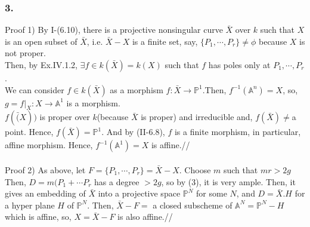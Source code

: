 \documentclass[12pt]{amsart}           %
\begin{document}
\subsubsection*{ 3.}

Proof 1) By I-(6.10), there is a projective nonsingular curve $\bar{X}$ over $k$ such that $X$ is an open subset of $\bar{X}$, i.e. $\bar{X} -X$ is a finite set, say, $\{P_1, \cdots, P_r \} \not = \phi$ because $X$ is not proper.\\
Then, by Ex.IV.1.2, $\exists f \in k(\bar{X}) = k(X)$ such that $f$ has poles only at $P_1 , \cdots, P_r$.\\
We can consider $f \in k(\bar{X})$ as a morphism $f : \bar{X} \to \mathbb{P}^1$.Then, $f^{-1} (\mathbb{A}^n) = X$, so, $g=f|_X : X \to \mathbb{A}^1$ is a morphism.\\
$f(\bar(X))$ is proper over $k$(because $\bar{X}$ is proper) and irreducible and, $f(\bar{X}) \not = $a point. Hence, $f(\bar{X}) = \mathbb{P}^1$. And by (II-6.8), $f$ is a finite morphism, in particular, affine morphism. Hence, $f^{-1} (\mathbb{A}^1) =X$ is affine.//\\
\\
Proof 2) As above, let $F=\{P_1 , \cdots , P_r\}= \bar{X} -X$. Choose $m$ such that $mr>2g$ Then, $D = m(P_1 + \cdots P_r$ has a degree $>2g$, so by (3), it is very ample. Then, it gives an embedding of $\bar{X}$ into a projective space $\mathbb{P}^N$ for some $N$, and $D= \bar{X}.H$ for a hyper plane $H$ of  $\mathbb{P}^N$. Then, $\bar{X}-F =$ a closed subscheme of $\mathbb{A}^N = \mathbb{P}^N - H$ which is affine, so, $X=\bar{X}-F$ is also affine.//
\end{document}
